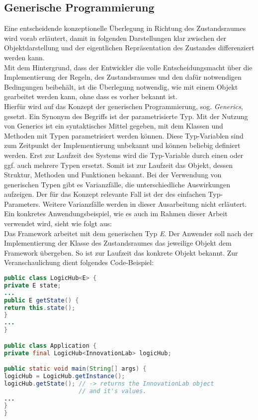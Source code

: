 \subsection{Generische Programmierung} %
Eine entscheidende konzeptionelle Überlegung in Richtung des Zustandsraumes wird vorab erläutert, damit in 
folgenden Darstellungen klar zwischen der Objektdarstellung und der eigentlichen Repräsentation des Zustandes 
differenziert werden kann. 
\\
Mit dem Hintergrund, dass der Entwickler die volle Entscheidungsmacht über die Implementierung der 
Regeln, des Zustandsraumes und den dafür notwendigen Bedingungen beibehält, ist die Überlegung  
notwendig, wie mit einem Objekt gearbeitet werden kann, ohne dass es vorher bekannt ist. 
\\
\linebreak
Hierfür wird auf das Konzept der generischen Programmierung, sog. \textit{Generics}, gesetzt. Ein Synonym 
des Begriffs ist der parametrisierte Typ. Mit der Nutzung von Generics ist ein syntaktisches Mittel 
gegeben, mit dem Klassen und Methoden mit Typen parametrisiert werden können. Diese Typ-Variablen sind zum 
Zeitpunkt der Implementierung unbekannt und können beliebig definiert werden. Erst zur Laufzeit des Systems 
wird die Typ-Variable durch einen oder ggf. auch mehrere Typen ersetzt. Somit ist zur Laufzeit das 
Objekt, dessen Struktur, Methoden und Funktionen bekannt. Bei der Verwendung von generischen Typen gibt es 
Varianzfälle, die unterschiedliche Auswirkungen aufzeigen. Der für das Konzept relevante Fall ist der des 
einfachen Typ-Parameters. Weitere Varianzfälle werden in dieser Ausarbeitung nicht erläutert. 
\\
\linebreak
Ein konkretes Anwendungsbeispiel, wie es 
auch im Rahmen dieser Arbeit verwendet wird, sieht wie folgt aus:
\\
Das Framework arbeitet mit dem generischen Typ \textit{E}. Der Anwender soll nach der Implementierung der Klasse des Zustandsraumes das 
jeweilige Objekt dem Framework übergeben. So ist zur Laufzeit das konkrete Objekt bekannt. Zur Veranschaulichung dient folgendes Code-Beispiel:
\begin{lstlisting}[language=Java, frame=lines, xleftmargin=\parindent, style=algoBericht, label={code:generics}, captionpos=b, caption={Zustandsobjekt als Typ-Variable}]
public class LogicHub<E> {
private E state;
...
public E getState() {
return this.state();
}
...
}

public class Application {
private final LogicHub<InnovationLab> logicHub;

public static void main(String[] args) {
logicHub = LogicHub.getInstance();
logicHub.getState(); // -> returns the InnovationLab object 
                     // and it's values.
...
}
}
\end{lstlisting}
